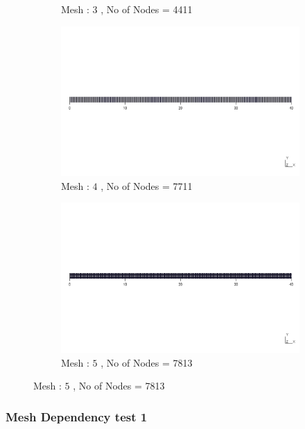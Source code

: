 \documentclass[9pt]{beamer}
\begin{document}
\begin{frame}
\begin{figure}[h!]
\begin{subfigure}{1\textwidth}
\caption{Mesh : $3$ , No of Nodes = 4411}
\end{subfigure}\vfill
\begin{subfigure}{1\textwidth}
\includegraphics[width=\linewidth,trim={0.2cm 11cm 0.2cm 11cm},clip]{Mesh_Dependency/meshes/4.png}
\caption{Mesh : $4$ , No of Nodes = 7711}
\end{subfigure}\vfill
\begin{subfigure}{1\textwidth}
\includegraphics[width=\linewidth,trim={0.2cm 11cm 0.2cm 11cm},clip]{Mesh_Dependency/meshes/5.png}
\caption{Mesh : $5$ , No of Nodes = 7813}
\end{subfigure}

\end{figure}

\end{frame}




\begin{frame}
\frametitle{Mesh Dependency test 1}
\begin{figure}[h!]
\centering

\end{figure}
\end{frame}
\end{document}
